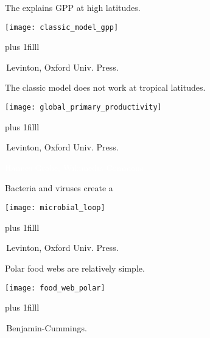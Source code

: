 \documentclass[t]{beamer}
\begin{document}
\begin{frame}[t]{The  explains GPP at high latitudes.}

	\vspace*{-\baselineskip}
	\begin{center}
		\texttt{[image: classic\_model\_gpp]}
	\end{center}
	\vskip0pt plus 1filll
	
\tiny\textcopyright\,Levinton, Oxford Univ. Press.
\end{frame}

\begin{frame}[t]{The classic model does not work at tropical latitudes.}

	\vspace*{-0.5\baselineskip}
	\begin{center}
		\texttt{[image: global\_primary\_productivity]}
	\end{center}
	\vskip0pt plus 1filll
	
\tiny\textcopyright\,Levinton, Oxford Univ. Press.
\end{frame}

{
\begin{frame}[b]
\tiny\hfill\textcolor{white}{Hannes Grobe, Wikimedia Commons}\qquad
\end{frame}
}

\begin{frame}[t]{Bacteria and viruses create a }

	\vspace*{-0.5\baselineskip}
	\begin{center}
		\texttt{[image: microbial\_loop]}
	\end{center}
	\vskip0pt plus 1filll
	
\tiny\textcopyright\,Levinton, Oxford Univ. Press.
\end{frame}

\begin{frame}[t]{Polar food webs are relatively simple.}

	\vspace*{-1\baselineskip}
	\begin{center}
		\texttt{[image: food\_web\_polar]}
	\end{center}
	\vskip0pt plus 1filll
	
\tiny\textcopyright\,Benjamin-Cummings.
\end{frame}
\end{document}
